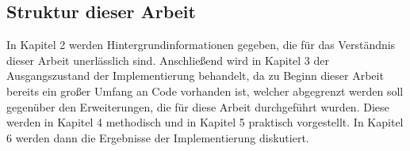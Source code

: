 \subsection{Struktur dieser Arbeit}
In Kapitel 2 werden Hintergrundinformationen gegeben, die für das Verständnis dieser Arbeit unerlässlich sind. Anschließend wird in Kapitel 3 der Ausgangszustand der Implementierung behandelt, da zu Beginn dieser Arbeit bereits ein großer Umfang an Code vorhanden ist, welcher abgegrenzt werden soll gegenüber den Erweiterungen, die für diese Arbeit durchgeführt wurden. Diese werden in Kapitel 4 methodisch und in Kapitel 5 praktisch vorgestellt. In Kapitel 6 werden dann die Ergebnisse der Implementierung diskutiert.